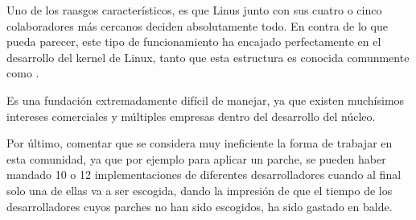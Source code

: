 Uno de los raasgos caracter\'isticos, es que Linus junto con sus cuatro o cinco colaboradores m\'as cercanos deciden absolutamente todo. En contra de lo que pueda parecer, este tipo de funcionamiento ha encajado perfectamente en el desarrollo del kernel de Linux, tanto que esta estructura es conocida comunmente como .

Es una fundaci\'on extremadamente dif\'icil de manejar, ya que existen much\'isimos intereses comerciales y m\'ultiples empresas dentro del desarrollo del n\'ucleo.

Por \'ultimo, comentar que se considera muy ineficiente la forma de trabajar en esta comunidad, ya que por ejemplo para aplicar un parche, se pueden haber mandado 10 o 12 implementaciones de diferentes desarrolladores cuando al final solo una de ellas va a ser escogida, dando la impresi\'on de que el tiempo de los desarrolladores cuyos parches no han sido escogidos, ha sido gastado en balde.
